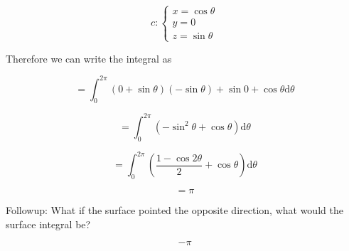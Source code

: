 \documentclass{article}
\newcommand{\D}[1]{\mathrm{d}#1}
\begin{document}
\[
c: \begin{cases} x = \cos{\theta} \\ y = 0 \\ z = \sin{\theta} \end{cases}
\]

Therefore we can write the integral as

\[
= \int_0^{2\pi} (0 + \sin{\theta})(-\sin{\theta}) + \sin{0} + \cos{\theta} \D{\theta}
\]

\[
= \int_0^{2\pi} (- \sin^2 \theta + \cos{\theta}) \D{\theta}
\]

\[
= \int_0^{2\pi} (\frac{1 - \cos{2 \theta}}{2} + \cos{\theta}) \D{\theta}
\]

\[
= \pi
\]

Followup: What if the surface pointed the opposite direction, what would the surface integral be?

\[
- \pi
\]
\end{document}
